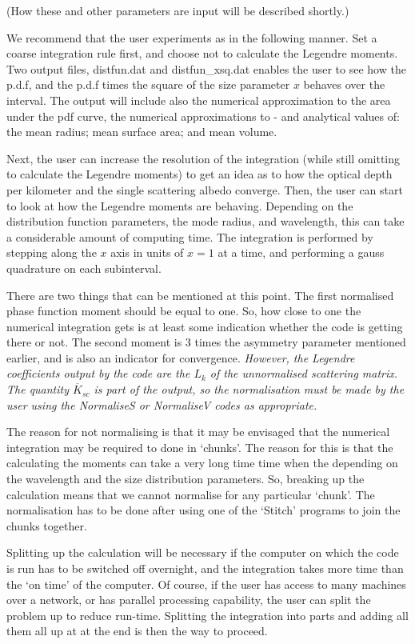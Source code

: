 \documentclass[12pt]{article}
\begin{document}
\begin{flushleft}
(How these and other parameters are input will be described shortly.)

We recommend that the user experiments as in the following manner. 
Set a coarse
integration rule first, and choose not to calculate the Legendre moments.
Two output files, distfun.dat and  distfun\_xsq.dat  enables the user to see how
the p.d.f, and the p.d.f times the square of the size parameter $x$ behaves over the
interval.
The output
will include also the numerical approximation to the
 area under the pdf curve, the numerical approximations to -  and
analytical values of: the mean radius; mean surface area; and mean volume.

Next, the user can increase the
resolution of the integration (while still omitting to calculate the Legendre
moments) to get an idea as to how the optical depth per kilometer and the single 
scattering albedo converge. Then, the user can start to look at how the
Legendre moments are behaving. Depending on the distribution function parameters,
the  mode radius, and wavelength, this can take a considerable amount of
 computing time. The integration is performed by stepping along the $x$ axis
in units of $x=1$ at a time, and performing a gauss quadrature on each subinterval.  

There are two things that can be mentioned at this point. The first normalised
phase function moment should
be equal to one. So, how close to one the numerical integration gets is at least some
indication whether the code is getting there or not. The second moment is
3 times the asymmetry parameter mentioned earlier, and is also an indicator for
convergence. {\it However, the Legendre coefficients output by the code are the $L_k$
of the unnormalised scattering matrix. The quantity ${\overline K_{sc}}$ is part of the 
output, so the normalisation must be made by the user using the NormaliseS or NormaliseV
codes as appropriate.}

The reason for not normalising is that it may be envisaged that the numerical integration
may be required to done in `chunks'. The reason for this is that the calculating the moments
can take a very long time time when the depending on the wavelength and the size
distribution parameters. So, breaking up the calculation means that we cannot
normalise for any particular `chunk'. The normalisation has to be done after using
 one of the `Stitch' programs to join the chunks together.

Splitting up the calculation will be necessary if the computer on which
the code is run has to be switched off overnight, and the integration takes more
time  than the `on time' of the computer. Of course, if the user has access to many
 machines over a network, or has parallel processing capability, the user can split 
the problem up to reduce run-time.
Splitting the integration into parts
and adding all them all up at at the end is then the way to proceed.


\end{flushleft}
\end{document}

